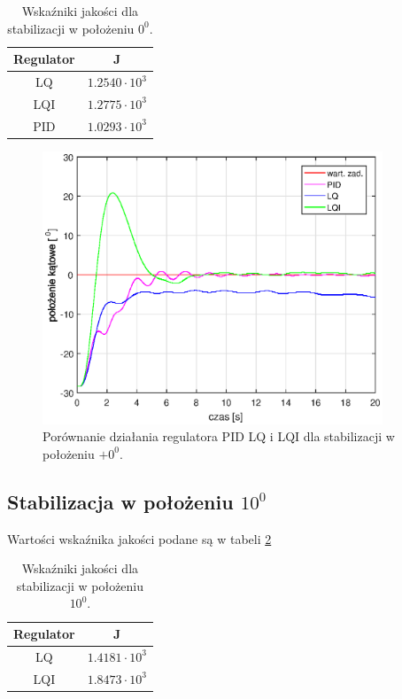 \documentclass[11pt,a4paper]{article}
\begin{document}
\begin{table}[h]
	\caption{Wska\'zniki jakości dla stabilizacji w położeniu $0^0$.}
	\label{por_reg_0_tab}
	\centering
	
	\begin{tabular}{|c|c|}
		\hline
		Regulator &J\\
		\hline
		LQ & $1.2540 \cdot 10 ^3$\\
		\hline
		LQI & $1.2775 \cdot 10 ^3$\\
		\hline
		PID & $ 1.0293 \cdot 10 ^3$\\ 
		\hline
	\end{tabular}
\end{table}

\begin{figure}[H]
	\centering
	\includegraphics[width=4in]{Figures/por_LQ0PID.eps}
	\caption{Porównanie działania regulatora PID LQ i LQI dla stabilizacji w położeniu $+0 ^0$.}
	\label{fig:por_LQPID_0}
\end{figure}

\subsection{Stabilizacja w położeniu $10^0$}
Wartości wska\'znika jakości podane są w tabeli \ref{por_reg_10_tab}

\begin{table}[h]
	\caption{Wska\'zniki jakości dla stabilizacji w położeniu $10^0$.}
	\label{por_reg_10_tab}
	\centering
	
	\begin{tabular}{|c|c|}
		\hline
		Regulator &J\\
		\hline
		LQ & $1.4181 \cdot 10 ^3$\\
		\hline
		LQI & $1.8473 \cdot 10 ^3$\\
		\hline
	\end{tabular}
\end{table}
\end{document}
